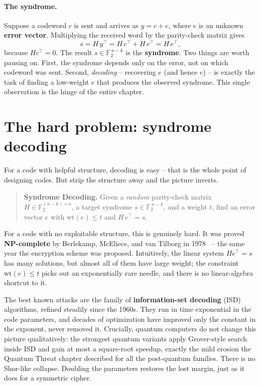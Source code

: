 \paragraph{The syndrome.}
Suppose a codeword $c$ is sent and arrives as $y = c + e$, where $e$ is an unknown \textbf{error vector}. Multiplying the received word by the parity-check matrix gives
\[
s = H\,y^\top = H\,c^\top + H\,e^\top = H\,e^\top ,
\]
because $Hc^\top = 0$. The result $s \in \mathbb{F}_2^{\,n-k}$ is the \textbf{syndrome}. Two things are worth pausing on. First, the syndrome depends only on the error, not on which codeword was sent. Second, \emph{decoding} -- recovering $e$ (and hence $c$) -- is exactly the task of finding a low-weight $e$ that produces the observed syndrome. This single observation is the hinge of the entire chapter.

\section{The hard problem: syndrome decoding}

For a code with helpful structure, decoding is easy -- that is the whole point of designing codes. But strip the structure away and the picture inverts.

\begin{quote}
\textbf{Syndrome Decoding.} Given a \emph{random} parity-check matrix $H \in \mathbb{F}_2^{(n-k)\times n}$, a target syndrome $s \in \mathbb{F}_2^{\,n-k}$, and a weight $t$, find an error vector $e$ with $\mathrm{wt}(e) \le t$ and $H\,e^\top = s$.
\end{quote}

For a code with no exploitable structure, this is genuinely hard. It was proved \textbf{NP-complete} by Berlekamp, McEliece, and van Tilborg in 1978~\cite{bmvt1978} -- the same year the encryption scheme was proposed. Intuitively, the linear system $He^\top = s$ has many solutions, but almost all of them have large weight; the constraint $\mathrm{wt}(e) \le t$ picks out an exponentially rare needle, and there is no linear-algebra shortcut to it.

The best known attacks are the family of \textbf{information-set decoding} (ISD) algorithms, refined steadily since the 1960s. They run in time exponential in the code parameters, and decades of optimization have improved only the constant in the exponent, never removed it. Crucially, quantum computers do not change this picture qualitatively: the strongest quantum variants apply Grover-style search inside ISD and gain at most a square-root speedup, exactly the mild erosion the Quantum Threat chapter described for all the post-quantum families. There is no Shor-like collapse. Doubling the parameters restores the lost margin, just as it does for a symmetric cipher.

